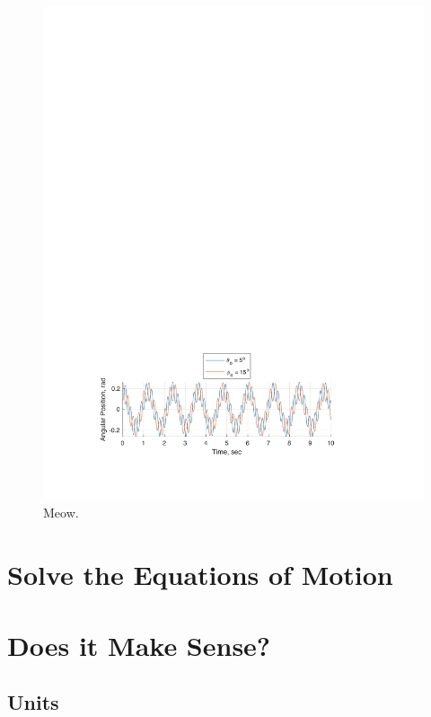 \documentclass[12pt]{report}
\begin{document}
\begin{flushleft}
\begin{figure}[ht]
  \includegraphics[center]{3}
  \caption{Meow.}
\end{figure}
\section{Solve the Equations of Motion}

\section{Does it Make Sense?}
\subsection{Units}


\end{flushleft}
\end{document}
